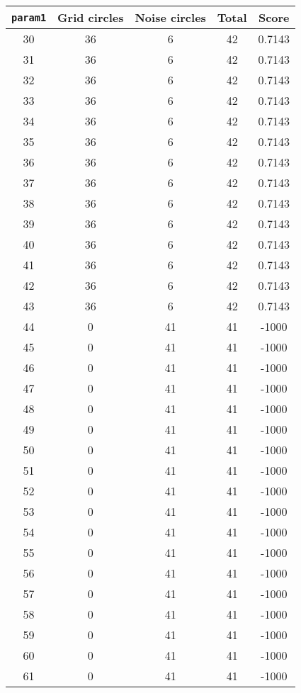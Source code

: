 \documentclass[letterpaper, 12pt]{article}
\begin{document}
\begin{longtable}{|c|c|c|c|c|}
\hline
\textbf{\texttt{param1}} & \textbf{Grid circles} & \textbf{Noise circles} & \textbf{Total} & \textbf{Score} \\
\hline
30 & 36 & 6 & 42 & 0.7143 \\
\hline
31 & 36 & 6 & 42 & 0.7143 \\
\hline
32 & 36 & 6 & 42 & 0.7143 \\
\hline
33 & 36 & 6 & 42 & 0.7143 \\
\hline
34 & 36 & 6 & 42 & 0.7143 \\
\hline
35 & 36 & 6 & 42 & 0.7143 \\
\hline
36 & 36 & 6 & 42 & 0.7143 \\
\hline
37 & 36 & 6 & 42 & 0.7143 \\
\hline
38 & 36 & 6 & 42 & 0.7143 \\
\hline
39 & 36 & 6 & 42 & 0.7143 \\
\hline
40 & 36 & 6 & 42 & 0.7143 \\
\hline
41 & 36 & 6 & 42 & 0.7143 \\
\hline
42 & 36 & 6 & 42 & 0.7143 \\
\hline
43 & 36 & 6 & 42 & 0.7143 \\
\hline
44 & 0 & 41 & 41 & -1000 \\
\hline
45 & 0 & 41 & 41 & -1000 \\
\hline
46 & 0 & 41 & 41 & -1000 \\
\hline
47 & 0 & 41 & 41 & -1000 \\
\hline
48 & 0 & 41 & 41 & -1000 \\
\hline
49 & 0 & 41 & 41 & -1000 \\
\hline
50 & 0 & 41 & 41 & -1000 \\
\hline
51 & 0 & 41 & 41 & -1000 \\
\hline
52 & 0 & 41 & 41 & -1000 \\
\hline
53 & 0 & 41 & 41 & -1000 \\
\hline
54 & 0 & 41 & 41 & -1000 \\
\hline
55 & 0 & 41 & 41 & -1000 \\
\hline
56 & 0 & 41 & 41 & -1000 \\
\hline
57 & 0 & 41 & 41 & -1000 \\
\hline
58 & 0 & 41 & 41 & -1000 \\
\hline
59 & 0 & 41 & 41 & -1000 \\
\hline
60 & 0 & 41 & 41 & -1000 \\
\hline
61 & 0 & 41 & 41 & -1000 \\

\end{longtable}
\end{document}
